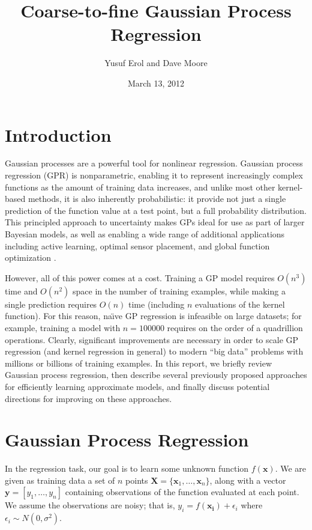 \documentclass{article}
\begin{document}
\title{Coarse-to-fine Gaussian Process Regression}
\author{Yusuf Erol and Dave Moore}
\date{March 13, 2012}
\maketitle

\section{Introduction}

Gaussian processes are a powerful tool for nonlinear regression. Gaussian process regression (GPR) is nonparametric, enabling it to represent increasingly complex functions as the amount of training data increases, and unlike most other kernel-based methods, it is also inherently probabilistic: it provide not just a single prediction of the function value at a test point, but a full probability distribution. This principled approach to uncertainty makes GPs ideal for use as part of larger Bayesian models, as well as enabling a wide range of additional applications including active learning, optimal sensor placement, and global function optimization \cite{guestrin2005near}\cite{osborne2009gaussian}. 

However, all of this power comes at a cost. Training a GP model requires $O(n^3)$ time and $O(n^2)$ space in the number of training examples, while making a single prediction requires $O(n)$ time (including $n$ evaluations of the kernel function). For this reason, na\"{\i}ve GP regression is infeasible on large datasets; for example, training a model with $n = 100000$ requires on the order of a quadrillion operations. Clearly, significant improvements are necessary in order to scale GP regression (and kernel regression in general) to modern ``big data'' problems with millions or billions of training examples. In this report, we briefly review Gaussian process regression, then describe several previously proposed approaches for efficiently learning approximate models, and finally discuss potential directions for improving on these approaches. 

\section{Gaussian Process Regression}
In the regression task, our goal is to learn some unknown function $f({\mathbf x})$. We are given as training data a set of $n$ points $\mathbf{X} = \{\mathbf{x}_1, \ldots, \mathbf{x}_n\}$, along with a vector $\mathbf{y} = [y_1, \ldots, y_n]$ containing observations of the function evaluated at each point. We assume the observations are noisy; that is, $y_i = f(\mathbf{x_i}) + \epsilon_i$ where $\epsilon_i \sim N(0, \sigma^2)$. 
\end{document}

